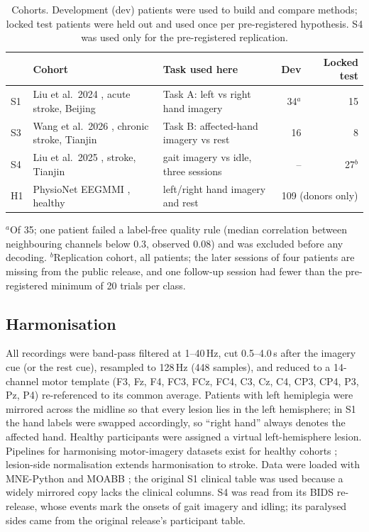 \documentclass[11pt]{article}
\begin{document}
\begin{table}[t]
\centering
\caption{Cohorts. Development (dev) patients were used to build and compare methods; locked test patients were held out and used once per pre-registered hypothesis. S4 was used only for the pre-registered replication.}
\label{tab:cohorts}
\small
\begin{tabularx}{\linewidth}{@{}l l X r r@{}}
\toprule
 & Cohort & Task used here & Dev & Locked test \\
\midrule
S1 & Liu et al.\ 2024 \citep{liu2024}, acute stroke, Beijing & Task A: left vs right hand imagery & 34$^a$ & 15 \\
S3 & Wang et al.\ 2026 \citep{wang2026}, chronic stroke, Tianjin & Task B: affected-hand imagery vs rest & 16 & 8 \\
S4 & Liu et al.\ 2025 \citep{liu2025gait}, stroke, Tianjin & gait imagery vs idle, three sessions & -- & 27$^b$ \\
H1 & PhysioNet EEGMMI \citep{schalk2004,goldberger2000}, healthy & left/right hand imagery and rest & \multicolumn{2}{c}{109 (donors only)} \\
\bottomrule
\end{tabularx}

\raggedright\footnotesize $^a$Of 35; one patient failed a label-free quality rule (median correlation between neighbouring channels below 0.3, observed 0.08) and was excluded before any decoding. $^b$Replication cohort, all patients; the later sessions of four patients are missing from the public release, and one follow-up session had fewer than the pre-registered minimum of 20 trials per class.
\end{table}

\subsection{Harmonisation}

All recordings were band-pass filtered at 1--40\,Hz, cut 0.5--4.0\,s after the imagery cue (or the rest cue), resampled to 128\,Hz (448 samples), and reduced to a 14-channel motor template (F3, Fz, F4, FC3, FCz, FC4, C3, Cz, C4, CP3, CP4, P3, Pz, P4) re-referenced to its common average. Patients with left hemiplegia were mirrored across the midline so that every lesion lies in the left hemisphere; in S1 the hand labels were swapped accordingly, so ``right hand'' always denotes the affected hand. Healthy participants were assigned a virtual left-hemisphere lesion. Pipelines for harmonising motor-imagery datasets exist for healthy cohorts \citep{liu2025cleanmi}; lesion-side normalisation extends harmonisation to stroke. Data were loaded with MNE-Python \citep{gramfort2013} and MOABB \citep{jayaram2018}; the original S1 clinical table was used because a widely mirrored copy lacks the clinical columns. S4 was read from its BIDS re-release, whose events mark the onsets of gait imagery and idling; its paralysed sides came from the original release's participant table.
\end{document}
